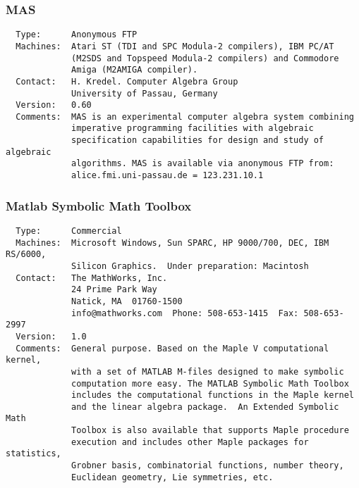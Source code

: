 \documentclass[twoside,11pt]{article}
\begin{document}
\subsubsection{MAS}
\begin{verbatim}
  Type:      Anonymous FTP
  Machines:  Atari ST (TDI and SPC Modula-2 compilers), IBM PC/AT
             (M2SDS and Topspeed Modula-2 compilers) and Commodore
             Amiga (M2AMIGA compiler).
  Contact:   H. Kredel. Computer Algebra Group
             University of Passau, Germany
  Version:   0.60
  Comments:  MAS is an experimental computer algebra system combining
             imperative programming facilities with algebraic
             specification capabilities for design and study of algebraic
             algorithms. MAS is available via anonymous FTP from:
             alice.fmi.uni-passau.de = 123.231.10.1
\end{verbatim}

\subsubsection{Matlab Symbolic Math Toolbox}
\begin{verbatim}
  Type:      Commercial
  Machines:  Microsoft Windows, Sun SPARC, HP 9000/700, DEC, IBM RS/6000,
             Silicon Graphics.  Under preparation: Macintosh
  Contact:   The MathWorks, Inc.
             24 Prime Park Way
             Natick, MA  01760-1500
             info@mathworks.com  Phone: 508-653-1415  Fax: 508-653-2997
  Version:   1.0
  Comments:  General purpose. Based on the Maple V computational kernel,
             with a set of MATLAB M-files designed to make symbolic
             computation more easy. The MATLAB Symbolic Math Toolbox
             includes the computational functions in the Maple kernel
             and the linear algebra package.  An Extended Symbolic Math
             Toolbox is also available that supports Maple procedure
             execution and includes other Maple packages for statistics,
             Grobner basis, combinatorial functions, number theory,
             Euclidean geometry, Lie symmetries, etc.
\end{verbatim}
\end{document}
